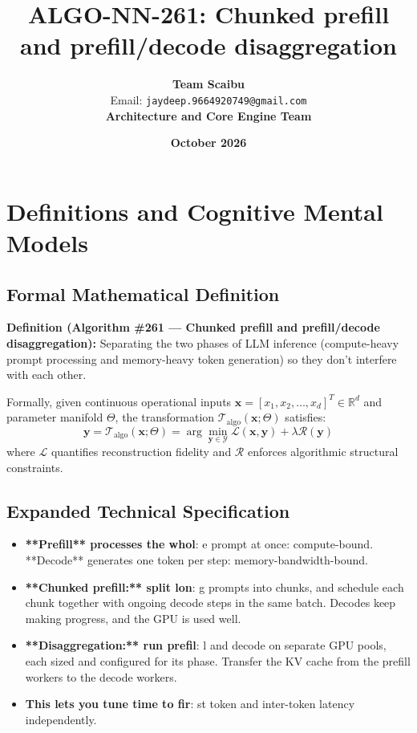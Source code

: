 \documentclass[11pt,a4paper]{article}
\title{\textbf{ALGO-NN-261: Chunked prefill and prefill/decode disaggregation}}
\author{\textbf{Team Scaibu} \\ \small Email: \texttt{jaydeep.9664920749@gmail.com} \\ \small \textbf{Architecture and Core Engine Team}}
\date{\textbf{October 2026}}
\theoremstyle{definition}
\begin{document}
\maketitle

\section{Definitions and Cognitive Mental Models}

\subsection{Formal Mathematical Definition}
\textbf{Definition (Algorithm \#261 --- Chunked prefill and prefill/decode disaggregation):}
Separating the two phases of LLM inference (compute-heavy prompt processing and memory-heavy token generation) so they don't interfere with each other.

Formally, given continuous operational inputs $\mathbf{x} = [x_1, x_2, \dots, x_d]^T \in \mathbb{R}^d$ and parameter manifold $\Theta$, the transformation $\mathcal{T}_{\text{algo}}(\mathbf{x}; \Theta)$ satisfies:
{\boldmath
\begin{equation}
\mathbf{y} = \mathcal{T}_{\text{algo}}(\mathbf{x}; \Theta) = \arg\min_{\mathbf{y} \in \mathcal{Y}} \mathcal{L}(\mathbf{x}, \mathbf{y}) + \lambda \mathcal{R}(\mathbf{y})
\end{equation}
}
where $\mathcal{L}$ quantifies reconstruction fidelity and $\mathcal{R}$ enforces algorithmic structural constraints.

\subsection{Expanded Technical Specification}
\begin{itemize}
\item \textbf{**Prefill** processes the whol}: e prompt at once: compute-bound. **Decode** generates one token per step: memory-bandwidth-bound.
\item \textbf{**Chunked prefill:** split lon}: g prompts into chunks, and schedule each chunk together with ongoing decode steps in the same batch. Decodes keep making progress, and the GPU is used well.
\item \textbf{**Disaggregation:** run prefil}: l and decode on separate GPU pools, each sized and configured for its phase. Transfer the KV cache from the prefill workers to the decode workers.
\item \textbf{This lets you tune time to fir}: st token and inter-token latency independently.
\end{itemize}
\end{document}
